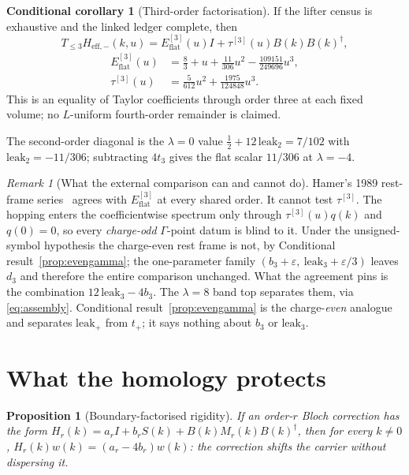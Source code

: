\documentclass[11pt]{article}
\theoremstyle{plain}
\newtheorem{proposition}[theorem]{Proposition}
\theoremstyle{definition}
\newtheorem{conditional}[theorem]{Conditional corollary}
\theoremstyle{remark}
\newtheorem{remark}[theorem]{Remark}
\newcommand{\chk}[1]{}
\newcommand{\dg}{^{\dagger}}
\begin{document}
\begin{conditional}[Third-order factorisation]\label{cor:su3}
If the lifter census is exhaustive and the linked ledger complete, then
\[
  T_{\le3}H_{\mathrm{eff},-}(k,u)
  =E_{\mathrm{flat}}^{[3]}(u)I+\tau^{[3]}(u)B(k)B(k)\dg,
\]
\[
  \begin{aligned}
    E_{\mathrm{flat}}^{[3]}(u)&=\tfrac83+u+\tfrac{11}{306}u^2-\tfrac{109151}{249696}u^3,\\
    \tau^{[3]}(u)&=\tfrac5{612}u^2+\tfrac{1975}{124848}u^3 .
  \end{aligned}
\]
This is an equality of Taylor coefficients through order three at each fixed
volume; no $L$-uniform fourth-order remainder is claimed.
\end{conditional}
\chk{E\_flat and t(u) carry the ledger coefficients}

The second-order diagonal is the $\lambda=0$ value
$\tfrac12+12\,\mathrm{leak}_2=7/102$ with $\mathrm{leak}_2=-11/306$;
subtracting $4t_3$ gives the flat scalar $11/306$ at $\lambda=-4$.
\chk{d\_- = 1/2 + 12*leak\_2, and leak\_2 = -11/306}

\begin{remark}[What the external comparison can and cannot do]
Hamer's 1989 rest-frame series~\cite{Hamer1989} agrees with
$E_{\mathrm{flat}}^{[3]}$ at every shared order. It cannot test
$\tau^{[3]}$. The hopping enters the coefficientwise spectrum only through
$\tau^{[3]}(u)q(k)$ and $q(0)=0$, so every \emph{charge-odd}
$\Gamma$-point datum is blind to it. Under the unsigned-symbol hypothesis the
charge-even rest frame is not, by Conditional result~\ref{prop:evengamma}; the one-parameter family
$(b_3+\varepsilon,\ \mathrm{leak}_3+\varepsilon/3)$ leaves $d_3$ and therefore
the entire comparison unchanged. What the agreement pins is the combination
$12\,\mathrm{leak}_3-4b_3$. The $\lambda=8$ band top separates them, via \eqref{eq:assembly}.
Conditional result~\ref{prop:evengamma} is the charge-\emph{even} analogue and
separates $\mathrm{leak}_+$ from $t_+$; it says nothing about $b_3$ or
$\mathrm{leak}_3$.
\chk{FINDING: no Gamma-point datum can constrain the hopping}
\end{remark}

\section{What the homology protects}

\begin{proposition}[Boundary-factorised rigidity]\label{prop:rigid}
If an order-$r$ Bloch correction has the form
$H_r(k)=a_rI+b_rS(k)+B(k)M_r(k)B(k)\dg$, then for every $k\neq0$,
$H_r(k)w(k)=(a_r-4b_r)w(k)$: the correction shifts the carrier without
dispersing it.
\end{proposition}
\end{document}
